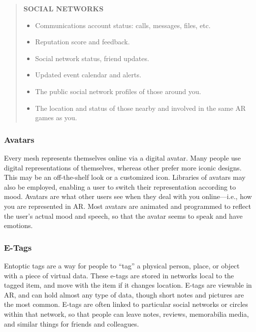 \begin{quotation}
\noindent \textbf{SOCIAL NETWORKS}
\begin{itemize}
\item Communications account status: calls, messages, files, etc.
\item Reputation score and feedback.
\item Social network status, friend updates.
\item Updated event calendar and alerts.
\item The public social network profiles of those around you.
\item The location and status of those nearby and involved in the same AR games as you.
\end{itemize}
\end{quotation}


\subsubsection{Avatars}

Every mesh represents themselves online via a digital
avatar. Many people use digital representations
of themselves, whereas other prefer more iconic 
designs. This may be an off-the-shelf look or a 
customized icon. Libraries of avatars may also be 
employed, enabling a user to switch their representation
according to mood. Avatars are what other
users see when they deal with you online—i.e., how 
you are represented in AR. Most avatars are animated
and programmed to reflect the user's actual
mood and speech, so that the avatar seems to speak 
and have emotions.

\subsubsection{E-Tags}

Entoptic tags are a way for people to ``tag'' a physical 
person, place, or object with a piece of virtual data. 
These e-tags are stored in networks local to the tagged 
item, and move with the item if it changes location. 
E-tags are viewable in AR, and can hold almost any 
type of data, though short notes and pictures are the 
most common. E-tags are often linked to particular 
social networks or circles within that network, so that 
people can leave notes, reviews, memorabilia media, 
and similar things for friends and colleagues.


